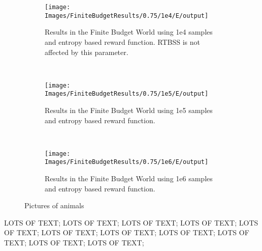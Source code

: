 \begin{figure}[h]
        \centering
        \begin{subfigure}[t]{0.3\textwidth}
                \texttt{[image: Images/FiniteBudgetResults/0.75/1e4/E/output]}
                \caption{Results in the Finite Budget World using 1e4 samples and entropy based reward
                function. RTBSS is not affected by this parameter.}
                \label{fig:m4e}
        \end{subfigure}%
        ~ %
        \begin{subfigure}[t]{0.3\textwidth}
                \texttt{[image: Images/FiniteBudgetResults/0.75/1e5/E/output]}
                \caption{Results in the Finite Budget World using 1e5 samples and entropy based reward
                function.}
                \label{fig:m5e}
        \end{subfigure}
        ~ %
        \begin{subfigure}[t]{0.3\textwidth}
                \texttt{[image: Images/FiniteBudgetResults/0.75/1e6/E/output]}
                \caption{Results in the Finite Budget World using 1e6 samples and entropy based reward
                function.}
                \label{fig:m6e}
        \end{subfigure}
        \caption{Pictures of animals}\label{fig:me}
\end{figure}

LOTS OF TEXT; LOTS OF TEXT; LOTS OF TEXT; LOTS OF TEXT; LOTS OF TEXT; LOTS OF TEXT; LOTS OF TEXT; LOTS OF TEXT; LOTS OF TEXT; LOTS OF TEXT; LOTS OF TEXT;

